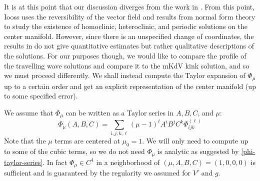 It is at this point that our discussion diverges from the work in \cite{iooss2000travelling}. From this point, Iooss uses the reversibility of the vector field and results from normal form theory to study the existence of homoclinic, heteroclinic, and periodic solutions on the center manifold. However, since there is an unspecified change of coordinates, the results in \cite{iooss2000travelling} do not give quantitative estimates but rather qualitative descriptions of the solutions. For our purposes though, we would like to compare the profile of the travelling wave solutions and compare it to the mKdV kink solution, and so we must proceed differently. We shall instead compute the Taylor expansion of \(\Phi_\mu\) up to a certain order and get an explicit representation of the center manifold (up to some specified error).


We assume that \(\Phi_\mu\) can be written as a Taylor series in \(A,B,C\), and \(\mu\):
\begin{equation}\label{phi-taylor-series}
	\Phi_\mu(A,B,C) = \sum_{i,j,k,\ell} (\mu - 1)^\ell A^i B^j C^k \Phi^{(\ell)}_{ijk} 
\end{equation}
Note that the \(\mu\) terms are centered at \(\mu_0 = 1\). We will only need to compute up to some of the cubic terms, so we do not need \(\Phi_\mu\) is analytic as suggested by \cref{phi-taylor-series}. In fact \(\Phi_\mu \in C^4\) in a neighborhood of \((\mu, A, B, C) = (1,0,0,0)\) is sufficient and is guaranteed by the regularity we assumed for \(V'\) and \(g\).

